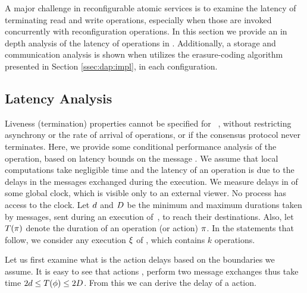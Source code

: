 A major challenge in reconfigurable atomic services is to examine the latency of terminating read and write operations, especially when those are invoked concurrently with reconfiguration operations. 
In this section we provide an in depth analysis of the latency of operations in \ares{}. Additionally, a storage and communication analysis is shown when \ares{} utilizes 
the erasure-coding algorithm presented in Section \ref{ssec:dap:impl}, in each configuration. 


\subsection{Latency Analysis}
\label{sec:safety:d}
Liveness (termination) properties cannot be specified for ~\ares{}, without restricting asynchrony  or the
rate of arrival of  operations, or if the consensus protocol never terminates.
Here,  we provide some conditional performance analysis of the operation, based on 
latency bounds on the message . %
 We assume that local computations take negligible time and the latency of an 
operation is  due to the delays in the messages exchanged during the execution. 
We measure delays in  of some global clock, which is visible only to an external viewer.
No process has access to the clock.
Let $d$ and $D$ be the minimum and maximum durations taken by 
 messages, sent during an execution  of~\ares,  to reach their destinations.
 Also, let $T(\pi)$ denote the duration 
 of an operation (or action) $\pi$. In the statements that follow, 
 we consider any execution $\EX$ of \ares, which contains $k$  operations.


Let us first examine what is the action delays based on the boundaries we assume. 
It is easy to see that actions ,  perform two message exchanges thus take time $2d\leq T(\phi)\leq 2D$. 
From this we can derive the delay of  a  action.

